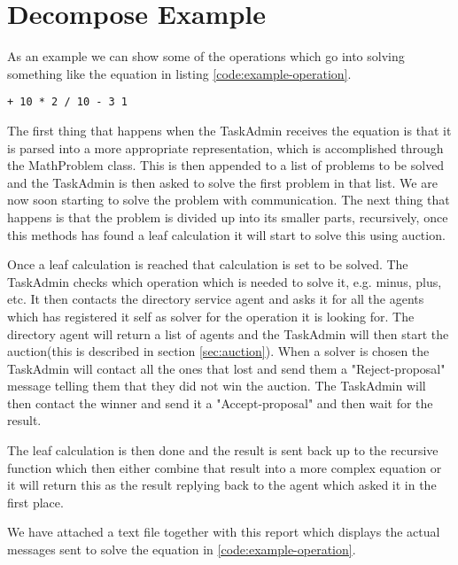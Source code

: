 \section{Decompose Example}\label{sec:decompose-example}
As an example we can show some of the operations which go into solving something
like the equation in listing \ref{code:example-operation}.

\begin{lstlisting}[frame=single, breaklines=true, caption=Example equation,
label=code:example-operation]
+ 10 * 2 / 10 - 3 1
\end{lstlisting}

The first thing that happens when the TaskAdmin receives the equation is that it
is parsed into a more appropriate representation, which is accomplished through
the MathProblem class. This is then appended to a list of problems to be solved
and the TaskAdmin is then asked to solve the first problem in that list. We are
now soon starting to solve the problem with communication. The next thing that
happens is that the problem is divided up into its smaller parts, recursively,
once this methods has found a leaf calculation it will start to solve this using
auction.

Once a leaf calculation is reached that calculation is set to be solved. The
TaskAdmin checks which operation which is needed to solve it, e.g. minus, plus,
etc. It then contacts the directory service agent and asks it for all the agents
which has registered it self as solver for the operation it is looking for. The
directory agent will return a list of agents and the TaskAdmin will then start
the auction(this is described in section \ref{sec:auction}). When a solver is
chosen the TaskAdmin will contact all the ones that lost and send them a
"Reject-proposal" message telling them that they did not win the auction. The
TaskAdmin will then contact the winner and send it a "Accept-proposal" and then
wait for the result.

The leaf calculation is then done and the result is sent back up to the
recursive function which then either combine that result into a more complex
equation or it will return this as the result replying back to the agent which
asked it in the first place.

We have attached a text file together with this report which displays the actual
messages sent to solve the equation in \ref{code:example-operation}.
